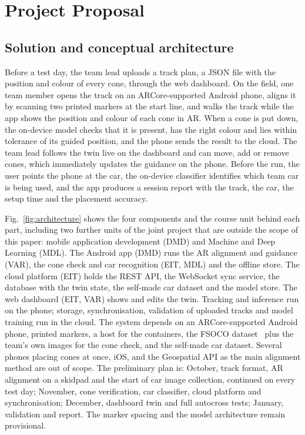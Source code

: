 \section{Project Proposal}
\subsection{Solution and conceptual architecture}
Before a test day, the team lead uploads a track plan, a JSON file with the position and colour of every cone, through the web dashboard. On the field, one team member opens the track on an ARCore-supported Android phone, aligns it by scanning two printed markers at the start line, and walks the track while the app shows the position and colour of each cone in AR. When a cone is put down, the on-device model checks that it is present, has the right colour and lies within tolerance of its guided position, and the phone sends the result to the cloud. The team lead follows the twin live on the dashboard and can move, add or remove cones, which immediately updates the guidance on the phone. Before the run, the user points the phone at the car, the on-device classifier identifies which team car is being used, and the app produces a session report with the track, the car, the setup time and the placement accuracy.

Fig.~\ref{fig:architecture} shows the four components and the course unit behind each part, including two further units of the joint project that are outside the scope of this paper: mobile application development (DMD) and Machine and Deep Learning (MDL). The Android app (DMD) runs the AR alignment and guidance (VAR), the cone check and car recognition (EIT, MDL) and the offline store. The cloud platform (EIT) holds the REST API, the WebSocket sync service, the database with the twin state, the self-made car dataset and the model store. The web dashboard (EIT, VAR) shows and edits the twin. Tracking and inference run on the phone; storage, synchronisation, validation of uploaded tracks and model training run in the cloud. The system depends on an ARCore-supported Android phone, printed markers, a host for the containers, the FSOCO dataset~\cite{vodisch2022} plus the team's own images for the cone check, and the self-made car dataset. Several phones placing cones at once, iOS, and the Geospatial API as the main alignment method are out of scope. The preliminary plan is: October, track format, AR alignment on a skidpad and the start of car image collection, continued on every test day; November, cone verification, car classifier, cloud platform and synchronisation; December, dashboard twin and full autocross tests; January, validation and report. The marker spacing and the model architecture remain provisional.


